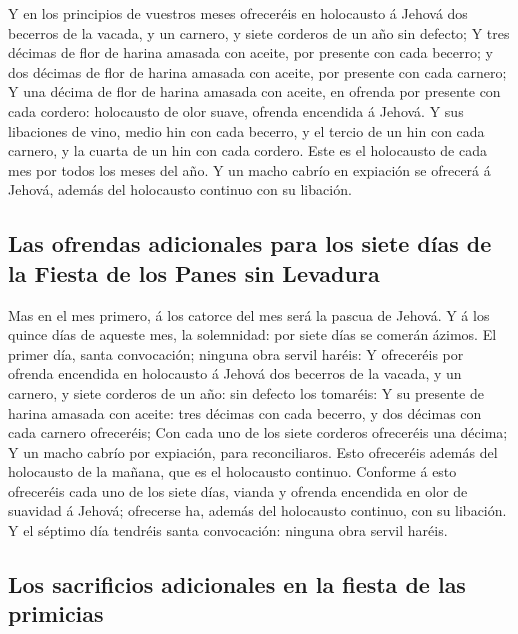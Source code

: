  Y en los principios de vuestros meses ofreceréis en
holocausto á Jehová dos becerros de la vacada, y un carnero, y siete
corderos de un año sin defecto;  Y tres décimas de flor de
harina amasada con aceite, por presente con cada becerro; y dos décimas
de flor de harina amasada con aceite, por presente con cada carnero;
 Y una décima de flor de harina amasada con aceite, en
ofrenda por presente con cada cordero: holocausto de olor suave, ofrenda
encendida á Jehová.  Y sus libaciones de vino, medio hin
con cada becerro, y el tercio de un hin con cada carnero, y la cuarta de
un hin con cada cordero. Este es el holocausto de cada mes por todos los
meses del año.  Y un macho cabrío en expiación se ofrecerá
á Jehová, además del holocausto continuo con su libación.

\hypertarget{las-ofrendas-adicionales-para-los-siete-duxedas-de-la-fiesta-de-los-panes-sin-levadura}{%
\subsection{Las ofrendas adicionales para los siete días de la Fiesta de
los Panes sin
Levadura}\label{las-ofrendas-adicionales-para-los-siete-duxedas-de-la-fiesta-de-los-panes-sin-levadura}}

 Mas en el mes primero, á los catorce del mes será la
pascua de Jehová.  Y á los quince días de aqueste mes, la
solemnidad: por siete días se comerán ázimos.  El primer
día, santa convocación; ninguna obra servil haréis:  Y
ofreceréis por ofrenda encendida en holocausto á Jehová dos becerros de
la vacada, y un carnero, y siete corderos de un año: sin defecto los
tomaréis:  Y su presente de harina amasada con aceite: tres
décimas con cada becerro, y dos décimas con cada carnero ofreceréis;
 Con cada uno de los siete corderos ofreceréis una décima;
 Y un macho cabrío por expiación, para reconciliaros.
 Esto ofreceréis además del holocausto de la mañana, que es
el holocausto continuo.  Conforme á esto ofreceréis cada
uno de los siete días, vianda y ofrenda encendida en olor de suavidad á
Jehová; ofrecerse ha, además del holocausto continuo, con su libación.
 Y el séptimo día tendréis santa convocación: ninguna obra
servil haréis.

\hypertarget{los-sacrificios-adicionales-en-la-fiesta-de-las-primicias}{%
\subsection{Los sacrificios adicionales en la fiesta de las
primicias}\label{los-sacrificios-adicionales-en-la-fiesta-de-las-primicias}}

